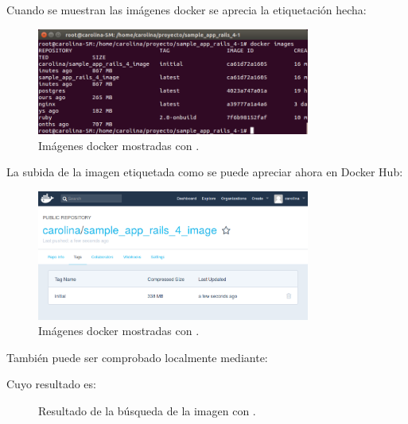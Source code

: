 Cuando se muestran las imágenes docker se aprecia la etiquetación hecha:

\begin{figure}[H]
\centering
\includegraphics[width=0.8\textwidth]{images/figures/dockerimages2.png}
\caption{Imágenes docker mostradas con .\label{fig:figure_placement_example}}
\end{figure}

La subida de la imagen etiquetada como  se puede apreciar ahora en Docker Hub:

\begin{figure}[H]
\centering
\includegraphics[width=0.8\textwidth]{images/figures/dockerhubinitial.png}
\caption{Imágenes docker mostradas con .\label{fig:figure_placement_example}}
\end{figure}

También puede ser comprobado localmente mediante:


Cuyo resultado es:

\begin{figure}[H]
\caption{Resultado de la búsqueda de la imagen con .\label{fig:figure_placement_example}}
\end{figure}

